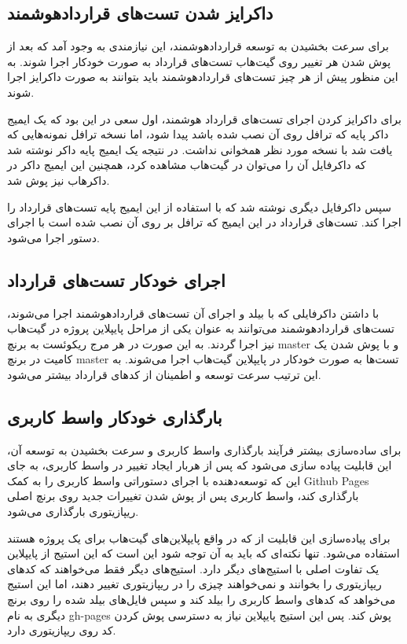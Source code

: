 \subsection{داکرایز شدن تست‌های قراردادهوشمند}
برای سرعت بخشیدن به توسعه قراردادهوشمند، این نیازمندی به وجود آمد که بعد از پوش شدن هر تغییر روی گیت‌هاب تست‌های قرارداد به صورت خودکار اجرا شوند. به این منظور پیش از هر چیز تست‌های قراردادهوشمند باید بتوانند به صورت داکرایز اجرا شوند.

برای داکرایز کردن اجرای تست‌های قرارداد هوشمند، اول سعی در این بود که یک ایمیج داکر پایه که ترافل روی آن نصب شده باشد پیدا شود، اما نسخه ترافل نمونه‌هایی که یافت شد با نسخه مورد نظر همخوانی نداشت. در نتیجه یک ایمیج پایه داکر نوشته شد که داکرفایل آن را می‌توان در گیت‌هاب
مشاهده کرد، همچنین این ایمیج داکر در داکرهاب
نیز پوش شد.

سپس داکرفایل دیگری نوشته شد که با استفاده از این ایمیج پایه تست‌های قرارداد را اجرا کند. تست‌های قرارداد در این ایمیج که ترافل بر روی آن نصب شده است با اجرای دستور
اجرا می‌شود.


\subsection{اجرای خودکار تست‌های قرارداد}
با داشتن داکرفایلی که با بیلد و اجرای آن تست‌های قراردادهوشمند اجرا می‌شوند، تست‌های قراردادهوشمند می‌توانند به عنوان یکی از مراحل پایپلاین پروژه در گیت‌هاب نیز اجرا گردند. به این صورت در هر مرج ریکوئست به برنچ master و با پوش شدن یک کامیت در برنچ master تست‌ها به صورت خودکار در پایپلاین گیت‌هاب اجرا می‌شوند. به این ترتیب سرعت توسعه و اطمینان از کدهای قرارداد بیشتر می‌شود.


\subsection{بارگذاری خودکار واسط کاربری}
برای ساده‌سازی بیشتر فرآیند بارگذاری واسط کاربری و سرعت بخشیدن به توسعه آن، این قابلیت پیاده سازی می‌شود که پس از هربار ایجاد تغییر در واسط کاربری، به جای این که توسعه‌دهنده با اجرای دستوراتی واسط کاربری را به کمک
\gls{Github Pages}
بارگذاری کند، واسط کاربری پس از پوش شدن تغییرات جدید روی برنچ اصلی ریپازیتوری بارگذاری می‌شود.

برای پیاده‌سازی این قابلیت از
که در واقع پایپلاین‌های گیت‌هاب برای یک پروژه هستند استفاده می‌شود. تنها نکته‌ای که باید به آن توجه شود این است که این استیج از پایپلاین یک تفاوت اصلی با استیج‌های دیگر دارد. استیج‌های دیگر فقط می‌خواهند که کدهای ریپازیتوری را بخوانند و نمی‌خواهند چیزی را در ریپازیتوری تغییر دهند، اما این استیج می‌خواهد که کد‌های واسط کاربری را بیلد کند و سپس فایل‌های بیلد شده را روی برنچ دیگری به نام gh-pages پوش کند. پس این استیج پایپلاین نیاز به دسترسی پوش کردن کد روی ریپازیتوری دارد.

